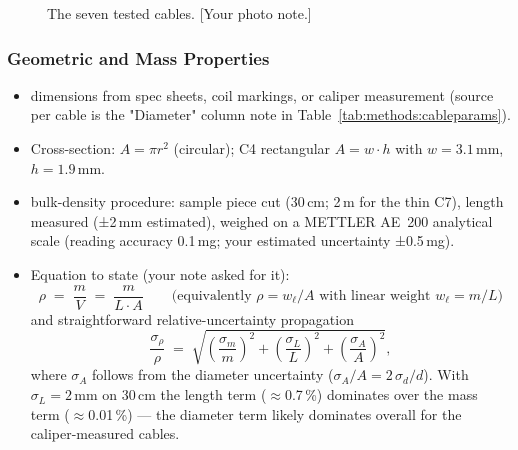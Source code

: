 \begin{figure}[htb]
  \centering
  \caption{The seven tested cables. [Your photo note.]}
  \label{fig:methods:cablephoto}
\end{figure}

\subsubsection{Geometric and Mass Properties}
\begin{itemize}
  \item [KEEP] dimensions from spec sheets, coil markings, or caliper
    measurement (source per cable is the "Diameter" column note in
    Table~\ref{tab:methods:cableparams}).
  \item Cross-section: $A = \pi r^2$ (circular); C4 rectangular
    $A = w \cdot h$ with $w = 3.1$\,mm, $h = 1.9$\,mm.
  \item [KEEP] bulk-density procedure: sample piece cut (30\,cm; 2\,m for the
    thin C7), length measured (±2\,mm estimated), weighed on a METTLER
    AE~200 analytical scale (reading accuracy 0.1\,mg; your estimated
    uncertainty ±0.5\,mg).
  \item Equation to state (your note asked for it):
    \[ \rho \;=\; \frac{m}{V} \;=\; \frac{m}{L \cdot A}
       \qquad\text{(equivalently } \rho = w_\ell / A
       \text{ with linear weight } w_\ell = m/L\text{)} \]
    and straightforward relative-uncertainty propagation
    \[ \frac{\sigma_\rho}{\rho} \;=\;
       \sqrt{\left(\frac{\sigma_m}{m}\right)^{\!2}
           + \left(\frac{\sigma_L}{L}\right)^{\!2}
           + \left(\frac{\sigma_A}{A}\right)^{\!2}} , \]
    where $\sigma_A$ follows from the diameter uncertainty
    ($\sigma_A/A = 2\,\sigma_d/d$). With $\sigma_L = 2$\,mm on 30\,cm the
    length term ($\approx$0.7\,\%) dominates over the mass term
    ($\approx$0.01\,\%) — the diameter term likely dominates overall for the
    caliper-measured cables.
\end{itemize}

